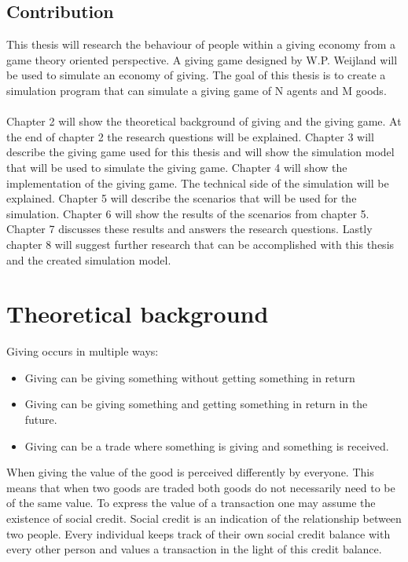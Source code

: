 \documentclass[twoside,openright]{uva-bachelor-thesis}
\begin{document}
\section{Contribution}
This thesis will research the behaviour of people within a giving economy from a game theory oriented perspective. A giving game designed by W.P. Weijland will be used to simulate an economy of giving. The goal of this thesis is to create a simulation program that can simulate a giving game of N agents and M goods. 
\\
\\
Chapter 2 will show the theoretical background of giving and the giving game. At the end of chapter 2 the research questions will be explained. Chapter 3 will describe the giving game used for this thesis and will show the simulation model that will be used to simulate the giving game. Chapter 4 will show the implementation of the giving game. The technical side of the simulation will be explained. Chapter 5 will describe the scenarios that will be used for the simulation. Chapter 6 will show the results of the scenarios from chapter 5. Chapter 7 discusses these results and answers the research questions. Lastly chapter 8 will suggest further research that can be accomplished with this thesis and the created simulation model.




\chapter{Theoretical background}
Giving occurs in multiple ways:
\begin{itemize}
\item Giving can be giving something without getting something in return
\item Giving can be giving something and getting something in return in the future.
\item Giving can be a trade where something is giving and something is received.
\end{itemize}
When giving the value of the good is perceived differently by everyone. This means that when two goods are traded both goods do not necessarily need to be of the same value. To express the value of a transaction one may assume the existence of social credit. Social credit is an indication of the relationship between two people. Every individual keeps track of their own social credit balance with every other person and values a transaction in the light of this credit balance.
\end{document}
